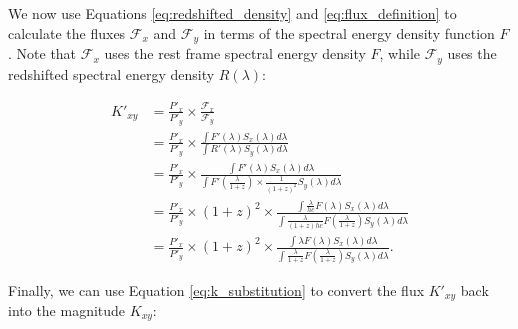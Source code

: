 \documentclass[linenumbers]{aastex631}
\begin{document}
We now use Equations \ref{eq:redshifted_density} and \ref{eq:flux_definition}
to calculate the fluxes $\mathcal{F}_x$ and $\mathcal{F}_y$ in terms of the
spectral energy density function $F$. Note that $\mathcal{F}_x$ uses the rest
frame spectral energy density $F$, while $\mathcal{F}_y$ uses the redshifted
spectral energy density $R(\lambda)$:

\begin{equation}
\begin{aligned}
  K'_{xy} &= \frac{P'_x}{P'_y} \times \frac{\mathcal{F}_x}{\mathcal{F}_y} \\
         &= \frac{P'_x}{P'_y} \times
              \frac{\int F'(\lambda) S_x(\lambda) d\lambda}
                   {\int R'(\lambda) S_y(\lambda) d\lambda} \\
         &= \frac{P'_x}{P'_y} \times
              \frac{\int F'(\lambda) S_x(\lambda) d\lambda}
                   {\int F'(\frac{\lambda}{1+z}) \times \frac{1}{(1 + z)^2} S_y(\lambda) d\lambda} \\
         &= \frac{P'_x}{P'_y} \times (1+z)^2 \times
              \frac{\int \frac{\lambda}{hc} F(\lambda) S_x(\lambda) d\lambda}
                   {\int \frac{\lambda}{(1+z)hc} F\left(\frac{\lambda}{1+z}\right) S_y(\lambda) d\lambda} \\
         &= \frac{P'_x}{P'_y} \times (1 + z)^2 \times
              \frac{\int \lambda F(\lambda) S_x(\lambda) d\lambda}
                   {\int \frac{\lambda}{1+z} F\left(\frac{\lambda}{1+z}\right) S_y(\lambda) d\lambda} .
\end{aligned}
\end{equation}

Finally, we can use Equation \ref{eq:k_substitution} to convert the flux $K'_{xy}$ back
into the magnitude $K_{xy}$:
\end{document}
